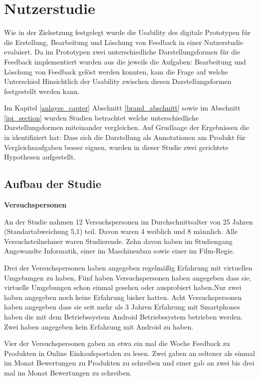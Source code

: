 \chapter{Nutzerstudie}

Wie in der Zielsetzung festgelegt wurde die Usability des digitale Prototypen für die Erstellung, Bearbeitung und Löschung von Feedback 
in einer Nutzerstudie evaluiert. Da im Prototypen zwei unterschiedliche Darstellungsformen für die Feedback implementiert wurden aus die jeweils die Aufgaben: Bearbeitung 
und Löschung von Feedback gelöst werden konnten, kam die Frage auf welche Unterschied Hinsichtlich der Usability zwischen diesen Darstellungsformen festgestellt werden kann. 

Im Kapitel \ref{anlayse_capter} Abschnitt \ref{brand_abschnitt} sowie im Abschnitt \ref{ipi_section} wurden Studien betrachtet welche unterschiedliche Darstellungsformen 
miteinander vergleichen. Auf Grudlaage der Ergebnissen die \citeauthor{Brandenburg2019} in \cite{Brandenburg2019} identifiziert hat: Dass sich die Darstellung als Annotationen 
am Produkt für Vergleichsaufgaben besser eignen, wurden in dieser Studie zwei gerichtete Hypothesen aufgestellt. 
 
\section{Aufbau der Studie}

\textbf{Versuchspersonen}

An der Studie nahmen 12 Versuchspersonen im Durchschnittsalter von 25 Jahren (Standartabweichung 5,1) teil.  Davon waren 4 weiblich und 8 männlich. 
Alle Versuchsteilnehmer waren Studierende. Zehn davon haben im Studiengang Angewandte Informatik, einer im Maschinenbau sowie einer im Film-Regie. 

Drei der Versuchspersonen haben angegeben regelmäßig Erfahrung mit virtuellen Umgebungen zu haben, Fünf haben  Versuchspersonen haben angegeben dass sie, virtuelle Umgebungen schon 
einmal gesehen oder ausprobiert haben.Nur zwei haben angegeben noch keine Erfahrung bisher hatten. 
Acht Versuchspersonen haben angegeben dass sie seit mehr als 3 Jahren Erfahrung mit Smartphones haben die mit dem Betriebssystem Android Betriebssystem betrieben werden. Zwei haben angegeben kein 
Erfahrung mit Android zu haben. 

Vier der Versuchspersonen gaben an etwa ein mal die Woche Feedback zu Produkten in Online Einkaufsportalen zu lesen. Zwei gaben an seltener als einmal im Monat Bewertungen zu Produkten zu schreiben und einer gab
an zwei bis drei mal im Monat Bewertungen zu schreiben. 

